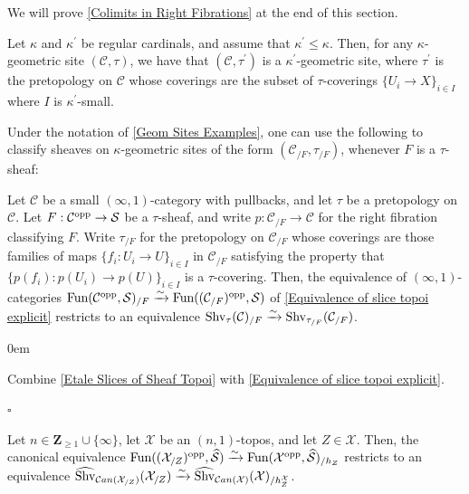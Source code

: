 \documentclass[10pt]{article}
\newcommand{\mS}{\mathcal S}
\newcommand{\C}{\mathcal C}
\newcommand{\cX}{\mathcal{X}}
\newcommand{\ZZ}{\mathbb{Z}}
\def\ZZ{{\mathbf Z}}
\renewcommand{\qed}{\hfill$\square$}
\renewenvironment{proof}{\begin{addmargin}[1em]{0em}\begin{newproof}}{\end{newproof}\end{addmargin}\qed}
\theoremstyle{witharg}
\theoremstyle{witharg}
\theoremstyle{witharg2}
\begin{document}
\noindent We will prove \ref{Colimits in Right Fibrations} at the end of this section. 



\begin{remark}{}\label{Induced Smaller Geometric Sites}

    Let $\kappa$ and $\kappa^\prime$ be regular cardinals, and assume that $\kappa^\prime\leq \kappa$. Then, for any $\kappa$-geometric site $(\C,\tau)$, we have that $(\C,\tau^\prime)$ is a $\kappa^\prime$-geometric site, where $\tau^\prime$ is the pretopology on $\C$ whose coverings are the subset of $\tau$-coverings $\{U_i\rightarrow X\}_{i\in I}$ where $I$ is $\kappa^\prime$-small. 
    
\end{remark}


Under the notation of \ref{Geom Sites Examples}, one can use the following to classify sheaves on $\kappa$-geometric sites of the form $(\C_{/F},\tau_{/F})$, whenever $F$ is a $\tau$-sheaf:

\begin{lemma}{}\label{Sheaves on Slices of Sites}

    Let $\C$ be a small $(\infty,1)$-category with pullbacks, and let $\tau$ be a pretopology on $\C$. Let $F:\C^{\textnormal{opp}}\rightarrow \mS$ be a $\tau$-sheaf, and write $p:\C_{/F}\rightarrow \C$ for the right fibration classifying $F$. Write $\tau_{/F}$ for the pretopology on $\C_{/F}$ whose coverings are those families of maps $\{f_i:U_i\rightarrow U\}_{i\in I}$ in $\C_{/F}$ satisfying the property that $\{p(f_i):p(U_i)\rightarrow p(U)\}_{i\in I}$ is a $\tau$-covering. Then, the equivalence of $(\infty,1)$-categories $\textnormal{Fun}(\C^{\textnormal{opp}},\mS)_{/F}\xrightarrow{\sim}\textnormal{Fun}((\C_{/F})^{\textnormal{opp}},\mS)$ of \ref{Equivalence of slice topoi explicit} restricts to an equivalence $\textnormal{Shv}_\tau(\C)_{/F}\xrightarrow{\sim}\textnormal{Shv}_{\tau_{/F}}(\C_{/F})$.
    
\end{lemma}

\begin{proof}

    Combine \ref{Etale Slices of Sheaf Topoi} with \ref{Equivalence of slice topoi explicit}.
    
\end{proof}



\begin{corollary}{}\label{Slices of sheaves of eff. epis.}

    Let $n\in \ZZ_{\geq 1}\cup \{\infty\}$, let $\cX$ be an $(n,1)$-topos, and let $Z\in \cX$. Then, the canonical equivalence $\textnormal{Fun}((\cX_{/Z})^{\textnormal{opp}},\widehat{\mS})\xrightarrow{\sim}\textnormal{Fun}(\cX^{\textnormal{opp}},\widehat{\mS})_{/h_Z}$ restricts to an equivalence $\widehat{\textnormal{Shv}}_{\C an(\cX_{/Z})}(\cX_{/Z})\xrightarrow{\sim}\widehat{\textnormal{Shv}}_{\C an(\cX)}(\cX)_{/h^\cX_Z}$.
    
\end{corollary}
\end{document}
